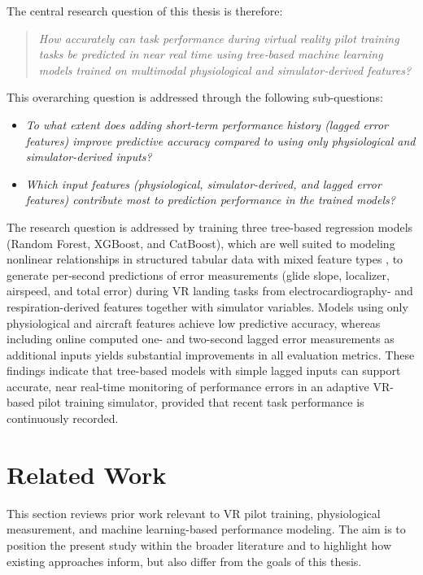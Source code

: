 \documentclass[11pt, a4paper]{article}
\begin{document}
The central research question of this thesis is therefore:

\begin{quote}
\emph{How accurately can task performance during virtual reality pilot training tasks be predicted in near real time using tree‑based machine learning models trained on multimodal physiological and simulator‑derived features?}
\end{quote}

This overarching question is addressed through the following sub-questions:
\begin{itemize}
    \item[RQ1] \emph{To what extent does adding short-term performance history (lagged error features) improve predictive accuracy compared to using only physiological and simulator-derived inputs?}
    \item[RQ2] \emph{Which input features (physiological, simulator-derived, and lagged error features) contribute most to prediction performance in the trained models?}
\end{itemize}

The research question is addressed by training three tree-based regression models (Random Forest, XGBoost, and CatBoost), which are well suited to modeling nonlinear relationships in structured tabular data with mixed feature types \cite{grinsztajn-2022,uddin-2024}, to generate per‑second predictions of error measurements (glide slope, localizer, airspeed, and total error) during VR landing tasks from electrocardiography- and respiration-derived features together with simulator variables. Models using only physiological and aircraft features achieve low predictive accuracy, whereas including online computed one- and two-second lagged error measurements as additional inputs yields substantial improvements in all evaluation metrics. These findings indicate that tree-based models with simple lagged inputs can support accurate, near real-time monitoring of performance errors in an adaptive VR-based pilot training simulator, provided that recent task performance is continuously recorded.

\section{Related Work}
This section reviews prior work relevant to VR pilot training, physiological measurement, and machine learning-based performance modeling. The aim is to position the present study within the broader literature and to highlight how existing approaches inform, but also differ from the goals of this thesis.
\end{document}
